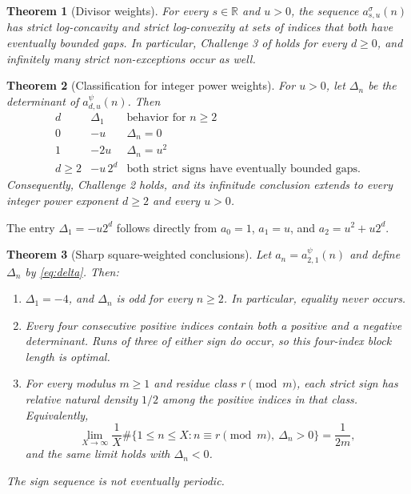 \documentclass[11pt,letterpaper]{article}
\newtheorem{theorem}{Theorem}[section]
\theoremstyle{definition}
\newcommand{\R}{\mathbb R}
\newcommand{\Delt}{\Delta}
\newcommand{\sig}{\sigma}
\numberwithin{equation}{section}
\begin{document}
\begin{theorem}[Divisor weights]\label{thm:divisor-main}
For every $s\in\R$ and $u>0$, the sequence $a^\sig_{s,u}(n)$ has strict
log-concavity and strict log-convexity at sets of indices that both have
eventually bounded gaps. In particular, Challenge 3 of \cite{HN23} holds
for every $d\ge0$, and infinitely many strict non-exceptions occur as well.
\end{theorem}

\begin{theorem}[Classification for integer power weights]\label{thm:power-main}
For $u>0$, let $\Delt_n$ be the determinant of $a^\psi_{d,u}(n)$.
Then
\begin{equation}\label{eq:classification}
\begin{array}{c|c|c}
 d & \Delt_1 & \text{behavior for }n\ge2\\ \hline
 0 & -u & \Delt_n=0\\
 1 & -2u & \Delt_n=u^2\\
 d\ge2 & -u\,2^d & \text{both strict signs have eventually bounded gaps.}
\end{array}
\end{equation}
Consequently, Challenge 2 holds, and its infinitude conclusion extends
to every integer power exponent $d\ge2$ and every $u>0$.
\end{theorem}
The entry $\Delt_1=-u2^d$ follows directly from
$a_0=1$, $a_1=u$, and $a_2=u^2+u2^d$.

\begin{theorem}[Sharp square-weighted conclusions]\label{thm:square-main}
Let $a_n=a^\psi_{2,1}(n)$ and define $\Delt_n$ by \eqref{eq:delta}.
Then:
\begin{enumerate}[label=(\roman*)]
\item $\Delt_1=-4$, and $\Delt_n$ is odd for every $n\ge2$.
In particular, equality never occurs.
\item Every four consecutive positive indices contain both a positive
and a negative determinant. Runs of three of either sign do occur, so
this four-index block length is optimal.
\item For every modulus $m\ge1$ and residue class $r\pmod m$, each strict
sign has relative natural density $1/2$ among the positive indices in
that class. Equivalently,
\begin{equation}\label{eq:AP-density}
\lim_{X\to\infty}\frac{1}{X}
 \#\{1\le n\le X:n\equiv r\pmod m,\ \Delt_n>0\}
 =\frac{1}{2m},
\end{equation}
and the same limit holds with $\Delt_n<0$.
\end{enumerate}
The sign sequence is not eventually periodic.
\end{theorem}
\end{document}
